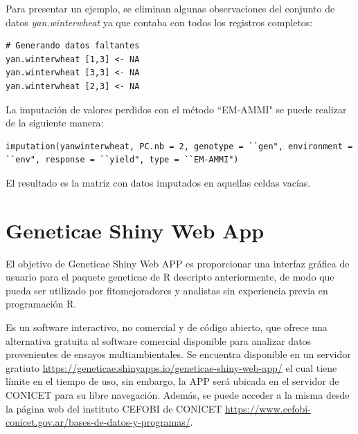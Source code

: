 Para presentar un ejemplo, se eliminan algunas observaciones del conjunto de datos \emph{yan.winterwheat} ya que contaba con todos los registros completos:

\begin{tcolorbox}[skin=bicolor,
    colframe=aurometalsaurus,colback=backcolour,colbacklower=white,
    width=1\linewidth,
    height=0.15\linewidth,
    boxsep=-3mm]
\begin{lstlisting}
# Generando datos faltantes
yan.winterwheat [1,3] <- NA
yan.winterwheat [3,3] <- NA
yan.winterwheat [2,3] <- NA
\end{lstlisting}
\end{tcolorbox}

La imputación de valores perdidos con el método ``EM-AMMI" se puede realizar de la siguiente manera:

\begin{tcolorbox}[skin=bicolor,
    colframe=aurometalsaurus,colback=backcolour,colbacklower=white,
    width=1\linewidth,
    height=0.1\linewidth,
    boxsep=-3mm]
\begin{lstlisting}
imputation(yanwinterwheat, PC.nb = 2, genotype = ``gen", environment = ``env", response = ``yield", type = ``EM-AMMI")
\end{lstlisting}
\end{tcolorbox}

El resultado es la matriz con datos imputados en aquellas celdas vacías. 


\section{Geneticae Shiny Web App}

El objetivo de Geneticae Shiny Web APP es proporcionar una interfaz gráfica de usuario para el paquete geneticae de R descripto anteriormente, de modo que pueda ser utilizado por fitomejoradores y analistas sin experiencia previa en programación R. 

Es un software interactivo, no comercial y de código abierto, que ofrece una alternativa gratuita al software comercial disponible para analizar datos provenientes de ensayos multiambientales. Se encuentra disponible en un servidor gratiuto \url{https://geneticae.shinyapps.io/geneticae-shiny-web-app/} el cual tiene límite en el tiempo de uso, sin embargo, la APP será ubicada en el servidor de CONICET para su libre navegación. Además, se puede acceder a la misma desde la página web del instituto CEFOBI de CONICET \url{https://www.cefobi-conicet.gov.ar/bases-de-datos-y-programas/}.

